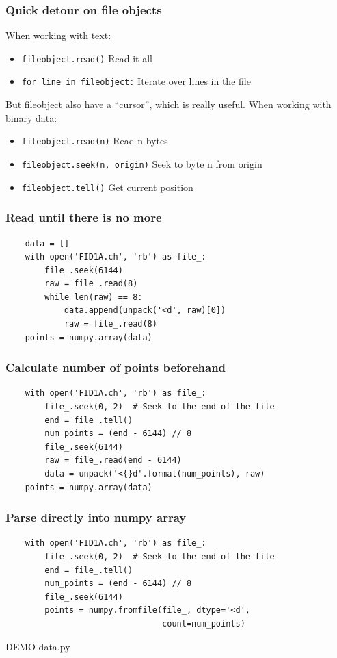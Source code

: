 \documentclass{beamer}
\begin{document}
\begin{frame}
  \frametitle{Quick detour on file objects}
  When working with text:
  \begin{itemize}
  \item \texttt{fileobject.read()}    Read it all
  \item \texttt{for line in fileobject:}    Iterate over lines in the file
  \end{itemize}
  But fileobject also have a ``cursor'', which is really useful. When
  working with binary data:
  \begin{itemize}
  \item \texttt{fileobject.read(n)}    Read n bytes
  \item \texttt{fileobject.seek(n, origin)}    Seek to byte n from origin
  \item \texttt{fileobject.tell()}    Get current position
  \end{itemize}
\end{frame}

\begin{frame}[fragile]
  \frametitle{Read until there is no more}
  \begin{verbatim}
    data = []
    with open('FID1A.ch', 'rb') as file_:
        file_.seek(6144)
        raw = file_.read(8)
        while len(raw) == 8:
            data.append(unpack('<d', raw)[0])
            raw = file_.read(8)
    points = numpy.array(data)    
  \end{verbatim}
\end{frame}

\begin{frame}[fragile]
  \frametitle{Calculate number of points beforehand}
  \begin{verbatim}
    with open('FID1A.ch', 'rb') as file_:
        file_.seek(0, 2)  # Seek to the end of the file
        end = file_.tell()
        num_points = (end - 6144) // 8
        file_.seek(6144)
        raw = file_.read(end - 6144)
        data = unpack('<{}d'.format(num_points), raw)
    points = numpy.array(data)
  \end{verbatim}
\end{frame}

\begin{frame}[fragile]
  \frametitle{Parse directly into numpy array}
  \begin{verbatim}
    with open('FID1A.ch', 'rb') as file_:
        file_.seek(0, 2)  # Seek to the end of the file
        end = file_.tell()
        num_points = (end - 6144) // 8
        file_.seek(6144)
        points = numpy.fromfile(file_, dtype='<d',
                                count=num_points)
  \end{verbatim}
  \vspace{1cm}
  \huge DEMO data.py
\end{frame}
\end{document}
